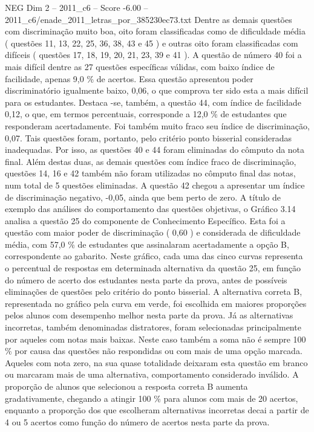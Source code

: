 \begin{textsample}{NEG Dim 2 – 2011\_c6 – Score -6.00 – 2011\_c6/enade\_2011\_letras\_por\_385230ec73.txt}
Dentre as demais questões com discriminação muito boa, oito foram classificadas como de dificuldade média ( questões 11, 13, 22, 25, 36, 38, 43 e 45 ) e outras oito foram classificadas com difíceis ( questões 17, 18, 19, 20, 21, 23, 39 e 41 ).
A questão de número 40 foi a mais difícil dentre as 27 questões específicas válidas, com baixo índice de facilidade, apenas 9,0 \% de acertos.
Essa questão apresentou poder discriminatório igualmente baixo, 0,06, o que comprova ter sido esta a mais difícil para os estudantes.
Destaca -se, também, a questão 44, com índice de facilidade 0,12, o que, em termos percentuais, corresponde a 12,0 \% de estudantes que responderam acertadamente.
Foi também muito fraco seu índice de discriminação, 0,07.
Tais questões foram, portanto, pelo critério ponto bisserial consideradas inadequadas.
Por isso, as questões 40 e 44 foram eliminadas do cômputo da nota final.
Além destas duas, as demais questões com índice fraco de discriminação, questões 14, 16 e 42 também não foram utilizadas no cômputo final das notas, num total de 5 questões eliminadas.
A questão 42 chegou a apresentar um índice de discriminação negativo, -0,05, ainda que bem perto de zero.
A título de exemplo das análises do comportamento das questões objetivas, o Gráfico 3.14 analisa a questão 25 do componente de Conhecimento Específico.
Esta foi a questão com maior poder de discriminação ( 0,60 ) e considerada de dificuldade média, com 57,0 \% de estudantes que assinalaram acertadamente a opção B, correspondente ao gabarito.
Neste gráfico, cada uma das cinco curvas representa o percentual de respostas em determinada alternativa da questão 25, em função do número de acerto dos estudantes nesta parte da prova, antes de possíveis eliminações de questões pelo critério do ponto bisserial.
A alternativa correta B, representada no gráfico pela curva em verde, foi escolhida em maiores proporções pelos alunos com desempenho melhor nesta parte da prova.
Já as alternativas incorretas, também denominadas distratores, foram selecionadas principalmente por aqueles com notas mais baixas.
Neste caso também a soma não é sempre 100 \% por causa das questões não respondidas ou com mais de uma opção marcada.
Aqueles com nota zero, na sua quase totalidade deixaram esta questão em branco ou marcaram mais de uma alternativa, comportamento considerado inválido.
A proporção de alunos que selecionou a resposta correta B aumenta gradativamente, chegando a atingir 100 \% para alunos com mais de 20 acertos, enquanto a proporção dos que escolheram alternativas incorretas decai a partir de 4 ou 5 acertos como função do número de acertos nesta parte da prova.

\end{textsample}
